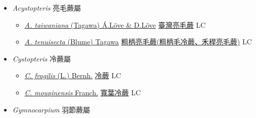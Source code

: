 
  \begin{itemize}
 \item[] \textit{Acystopteris} 亮毛蕨屬
                    
  \begin{itemize}
        \item[] \href{http://www.theplantlist.org/tpl1.1/search?q=Acystopteris+taiwaniana}{\textit{A. taiwaniana} (Tagawa) Á.Löve \& D.Löve}   \href{\detokenize{http://taibnet.sinica.edu.tw/chi/taibnet_species_list.php?T2=臺灣亮毛蕨&T2_new_value=true&fr=y}}{臺灣亮毛蕨} LC
        \item[] \href{http://www.theplantlist.org/tpl1.1/search?q=Acystopteris+tenuisecta}{\textit{A. tenuisecta} (Blume) Tagawa}     \href{\detokenize{http://taibnet.sinica.edu.tw/chi/taibnet_species_list.php?T2=粗柄亮毛蕨&T2_new_value=true&fr=y}}{粗柄亮毛蕨(粗柄毛冷蕨、禾稈亮毛蕨)}    LC
  \end{itemize}
 \item[] \textit{Cystopteris} 冷蕨屬
                    
  \begin{itemize}
        \item[] \href{http://www.theplantlist.org/tpl1.1/search?q=Cystopteris+fragilis}{\textit{C. fragilis} (L.) Bernh.}   \href{\detokenize{http://taibnet.sinica.edu.tw/chi/taibnet_species_list.php?T2=冷蕨&T2_new_value=true&fr=y}}{冷蕨} LC
        \item[] \href{http://www.theplantlist.org/tpl1.1/search?q=Cystopteris+moupinensis}{\textit{C. moupinensis} Franch.}   \href{\detokenize{http://taibnet.sinica.edu.tw/chi/taibnet_species_list.php?T2=寬葉冷蕨&T2_new_value=true&fr=y}}{寬葉冷蕨} LC
  \end{itemize}
 \item[] \textit{Gymnocarpium} 羽節蕨屬
                    

\end{itemize}
